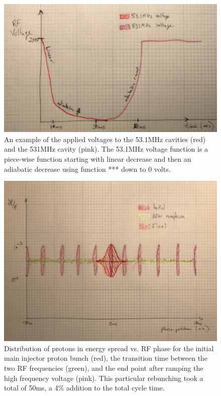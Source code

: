 \documentclass[12pt]{article}
\begin{document}
\begin{figure}[t]
	\begin{center}
        \includegraphics[width=1.0\linewidth]{Figures/draft_transition_voltages.JPG}
	\end{center}
	\caption{An example of the applied voltages to the 53.1MHz cavities (red) and the 531MHz cavity (pink). The 53.1MHz voltage function is a piece-wise function starting with linear decrease and then an adiabatic decrease using function *** down to 0 volts.}
		\label{fig:transition_voltages}
\end{figure}

\begin{figure}[t]
	\begin{center}
        \includegraphics[width=1.0\linewidth]{Figures/draft_bunch_distributions.JPG}
	\end{center}
	\caption{Distribution of protons in energy spread vs. RF phase for the initial main injector proton bunch (red), the transition time between the two RF frequencies (green), and the end point after ramping the high frequency voltage (pink). This particular rebunching took a total of 50ms, a 4\% addition to the total cycle time.}
		\label{fig:bunch_distributions}
\end{figure}
\end{document}
